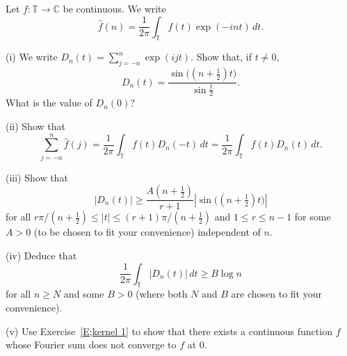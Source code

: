 \begin{exercise}\label{E;kernel 4}\label{C5.9} 
Let $f:{\mathbb T}\rightarrow{\mathbb C}$
be continuous. We write
\[\hat{f}(n)=\frac{1}{2\pi}\int_{\mathbb T}f(t)\exp(-int)\,dt.\]

(i) We write $D_{n}(t)=\sum_{j=-n}^{n}\exp(ijt)$.
Show that, if $t\neq 0$,
\[D_{n}(t)=\frac{\sin\big((n+\tfrac{1}{2})t\big)}
{\sin\tfrac{t}{2}}.\]
What is the value of $D_{n}(0)$?

(ii) Show that
\[\sum_{j=-n}^{n}\hat{f}(j)
=\frac{1}{2\pi}\int_{\mathbb T}f(t)D_{n}(-t)\,dt
=\frac{1}{2\pi}\int_{\mathbb T}f(t)D_{n}(t)\,dt.\]

(iii) Show that
\[|D_{n}(t)|\geq \frac{A(n+\tfrac{1}{2})}{r+1}
|\sin\big((n+\tfrac{1}{2})t\big)|\]
for all $r\pi/(n+\tfrac{1}{2})\leq |t|\leq (r+1)\pi/(n+\tfrac{1}{2})$
and $1\leq r\leq n-1$ for some $A>0$ (to be chosen to fit your convenience)
independent of $n$.

(iv) Deduce that
\[\frac{1}{2\pi}\int_{\mathbb T}|D_{n}(t)|\,dt\geq B\log n\]
for all $n\geq N$ and some $B>0$ (where both $N$ and $B$
are chosen to fit your convenience).

(v) Use Exercise~\ref{E;kernel 1} to show that
there exists a continuous function $f$ whose Fourier sum
does not converge to $f$ at $0$.
\end{exercise}


